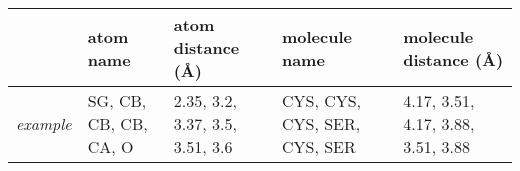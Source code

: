 \begin{tabular}{lL{2cm}L{3cm}L{3cm}L{3.5cm}}
  \toprule
  & atom name & atom distance (\AA) & molecule name & molecule distance (\AA)\\
  \midrule
  \textit{example}
    & SG, CB, CB, CB, CA, O
    & 2.35, 3.2, 3.37, 3.5, 3.51, 3.6
    & CYS, CYS, CYS, SER, CYS, SER
    & 4.17, 3.51, 4.17, 3.88, 3.51, 3.88 \\
  \bottomrule
\end{tabular}
